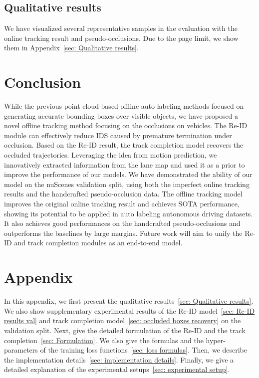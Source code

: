 \documentclass{article} \usepackage{iclr2023_conference,times}
\begin{document}
\vspace{-1mm}
\subsection{Qualitative results}
\vspace{-1mm}
We have visualized several representative samples in the evaluation with the online tracking result and pseudo-occlusions. Due to the page limit, we show them in Appendix~\ref{sec: Qualitative results}.


\vspace{-1mm}
\section{Conclusion}
\vspace{-1mm}
While the previous point cloud-based offline auto labeling methods focused on generating accurate bounding boxes over visible objects, we have proposed a novel offline tracking method focusing on the occlusions on vehicles. The Re-ID module can effectively reduce IDS caused by premature termination under occlusion. Based on the Re-ID result, the track completion model recovers the occluded trajectories. Leveraging the idea from motion prediction, we innovatively extracted information from the lane map and used it as a prior to improve the performance of our models. We have demonstrated the ability of our model on the nuScenes validation split, using both the imperfect online tracking results and the handcrafted pseudo-occlusion data. The offline tracking model improves the original online tracking result and achieves SOTA performance, showing its potential to be applied in auto labeling autonomous driving datasets. It also achieves good performances on the handcrafted pseudo-occlusions and outperforms the baselines by large margins. Future work will aim to unify the Re-ID and track completion modules as an end-to-end model.






\clearpage
\newpage

\appendix
\section*{Appendix}
In this appendix, we first present the qualitative results~\ref{sec: Qualitative results}. We also show supplementary experimental results of the Re-ID model~\ref{sec: Re-ID results val} and track completion model~\ref{sec: occluded boxes recovery} on the validation split. Next, give the detailed formulation of the Re-ID and the track completion~\ref{sec: Formulation}. We also give the formulas and the hyper-parameters of the training loss functions~\ref{sec: loss formulas}. Then, we describe the implementation details~\ref{sec: implementation details}. Finally, we give a detailed explanation of the experimental setups~\ref{sec: experimental setup}. 
\end{document}
